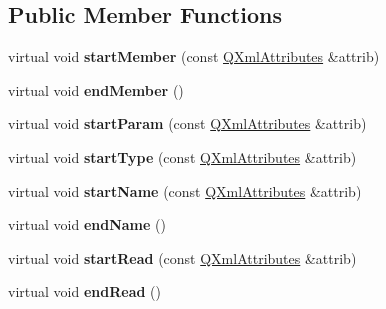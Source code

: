 \subsection*{Public Member Functions}
\begin{DoxyCompactItemize}
\item 
\mbox{\label{class_member_handler_ad6b8cc2d826d8ee3be294b368d50136b}} 
virtual void {\bfseries start\+Member} (const \mbox{\hyperlink{class_q_xml_attributes}{Q\+Xml\+Attributes}} \&attrib)
\item 
\mbox{\label{class_member_handler_a77d45fe7d1739f1018c0916b077d61a8}} 
virtual void {\bfseries end\+Member} ()
\item 
\mbox{\label{class_member_handler_acf75cf9bdba601949968d3ba7b9fdf0a}} 
virtual void {\bfseries start\+Param} (const \mbox{\hyperlink{class_q_xml_attributes}{Q\+Xml\+Attributes}} \&attrib)
\item 
\mbox{\label{class_member_handler_ab3a68fb1fd9422903a7628e464c55040}} 
virtual void {\bfseries start\+Type} (const \mbox{\hyperlink{class_q_xml_attributes}{Q\+Xml\+Attributes}} \&attrib)
\item 
\mbox{\label{class_member_handler_ac7f1e168ffe2238bd18cbd62b00c0537}} 
virtual void {\bfseries start\+Name} (const \mbox{\hyperlink{class_q_xml_attributes}{Q\+Xml\+Attributes}} \&attrib)
\item 
\mbox{\label{class_member_handler_a39940bd40484323c0d92567be6ee7f57}} 
virtual void {\bfseries end\+Name} ()
\item 
\mbox{\label{class_member_handler_a0bc96927d7fc108de2a7f6ffa8533aae}} 
virtual void {\bfseries start\+Read} (const \mbox{\hyperlink{class_q_xml_attributes}{Q\+Xml\+Attributes}} \&attrib)
\item 
\mbox{\label{class_member_handler_ad65021d641eab752562fd807e02bf604}} 
virtual void {\bfseries end\+Read} ()
\item 
\mbox{\label{class_member_handler_a01c2d1347b8aa86bde24ba4c583e8e1e}} 

\end{DoxyCompactItemize}
